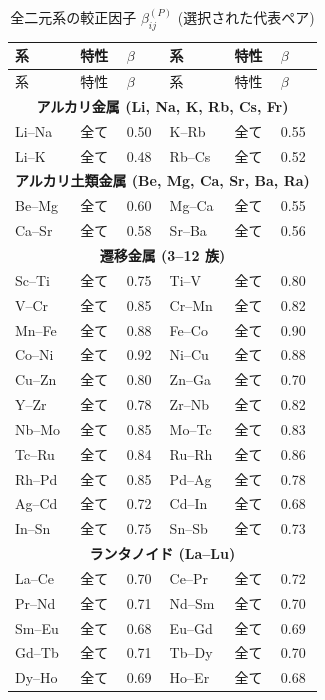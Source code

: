 \documentclass[11pt,a4paper]{article}
\theoremstyle{remark}
\begin{document}
	\begin{longtable}{p{1.5cm}p{1.5cm}p{1.2cm}p{1.2cm}p{1.2cm}p{1.2cm}}
		\caption{全二元系の較正因子 \(\beta_{ij}^{(P)}\) (選択された代表ペア)} \label{tab:beta-full} \\
		\toprule
		系 & 特性 & \(\beta\) & 系 & 特性 & \(\beta\) \\
		\midrule
		\endfirsthead
		\toprule
		系 & 特性 & \(\beta\) & 系 & 特性 & \(\beta\) \\
		\midrule
		\endhead
		\multicolumn{6}{c}{\textbf{アルカリ金属 (Li, Na, K, Rb, Cs, Fr)}} \\
		Li–Na & 全て & 0.50 & K–Rb & 全て & 0.55 \\
		Li–K  & 全て & 0.48 & Rb–Cs & 全て & 0.52 \\
		\multicolumn{6}{c}{\textbf{アルカリ土類金属 (Be, Mg, Ca, Sr, Ba, Ra)}} \\
		Be–Mg & 全て & 0.60 & Mg–Ca & 全て & 0.55 \\
		Ca–Sr & 全て & 0.58 & Sr–Ba & 全て & 0.56 \\
		\multicolumn{6}{c}{\textbf{遷移金属 (3–12 族)}} \\
		Sc–Ti & 全て & 0.75 & Ti–V & 全て & 0.80 \\
		V–Cr  & 全て & 0.85 & Cr–Mn & 全て & 0.82 \\
		Mn–Fe & 全て & 0.88 & Fe–Co & 全て & 0.90 \\
		Co–Ni & 全て & 0.92 & Ni–Cu & 全て & 0.88 \\
		Cu–Zn & 全て & 0.80 & Zn–Ga & 全て & 0.70 \\
		Y–Zr  & 全て & 0.78 & Zr–Nb & 全て & 0.82 \\
		Nb–Mo & 全て & 0.85 & Mo–Tc & 全て & 0.83 \\
		Tc–Ru & 全て & 0.84 & Ru–Rh & 全て & 0.86 \\
		Rh–Pd & 全て & 0.85 & Pd–Ag & 全て & 0.78 \\
		Ag–Cd & 全て & 0.72 & Cd–In & 全て & 0.68 \\
		In–Sn & 全て & 0.75 & Sn–Sb & 全て & 0.73 \\
		\multicolumn{6}{c}{\textbf{ランタノイド (La–Lu)}} \\
		La–Ce & 全て & 0.70 & Ce–Pr & 全て & 0.72 \\
		Pr–Nd & 全て & 0.71 & Nd–Sm & 全て & 0.70 \\
		Sm–Eu & 全て & 0.68 & Eu–Gd & 全て & 0.69 \\
		Gd–Tb & 全て & 0.71 & Tb–Dy & 全て & 0.70 \\
		Dy–Ho & 全て & 0.69 & Ho–Er & 全て & 0.68 \\

\end{longtable}
\end{document}
